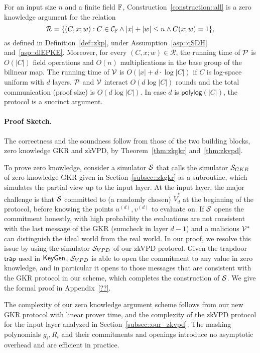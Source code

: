 \begin{theorem}\label{theorem:main}
	For an input size $n$ and a finite field $\F$, Construction~\ref{construction::all} is a zero knowledge argument for the relation
	\[
	\mathcal{R} = \{(C,x;w): C\in\mathcal{C}_\F\wedge|x|+|w|\le n\wedge C(x;w) = 1\},
	\]
	as defined in Definition~\ref{def::zkp}, under Assumption~\ref{asp::qSDH} and~\ref{asp::dlEPKE}. Moreover, for every $(C,x;w)\in\mathcal{R}$, the running time of $\P$ is $O(|C|)$ field operations and $O(n)$ multiplications in the base group of the bilinear map. The running time of $\V$ is $O(|x|+d\cdot\log |C|)$ if $C$ is log-space uniform with $d$ layers. $\P$ and $\V$ interact $O(d\log |C|)$ rounds and the total communication (proof size) is $O(d\log |C|)$. In case $d$ is $\mathsf{polylog}(|C|)$, the protocol is a succinct argument.
\end{theorem}

\paragraph{Proof Sketch.} The correctness and the soundness follow from those of the two building blocks, zero knowledge GKR and zkVPD, by Theorem~\ref{thm:zkgkr} and~\ref{thm:zkvpd}.

To prove zero knowledge, consider a simulator $\S$ that calls the simulator $\S_{GKR}$ of zero knowledge GKR given in Section~\ref{subsec::zkgkr} as a subroutine, which simulates the partial view up to the input layer. At the input layer, the major challenge is that $\S$ committed to (a randomly chosen) $\dot{V}^*_d$ at the beginning of the protocol, before knowing the points $u^{(d)}, v^{(d)}$ to evaluate on. If $\S$ opens the commitment honestly, with high probability the evaluations are not consistent with the last message of the GKR (sumcheck in layer $d-1$) and a malicious $\V^*$ can distinguish the ideal world from the real world. In our proof, we resolve this issue by using the simulator $\S_{VPD}$ of our zkVPD protocol. Given the trapdoor $\mathsf{trap}$ used in $\KeyGen$, $\S_{VPD}$ is able to open the commitment to any value in zero knowledge, and in particular it opens to those messages that are consistent with the GKR protocol in our scheme, which completes the construction of $\S$. We give the formal proof in Appendix~\ref{??}.  

The complexity of our zero knowledge argument scheme follows from our new GKR protocol with linear prover time, and the complexity of the zkVPD protocol for the input layer analyzed in Section~\ref{subsec::our_zkvpd}. The masking polynomials $g_i, R_i$ and their commitments and openings introduce no asymptotic overhead and are efficient in practice.




